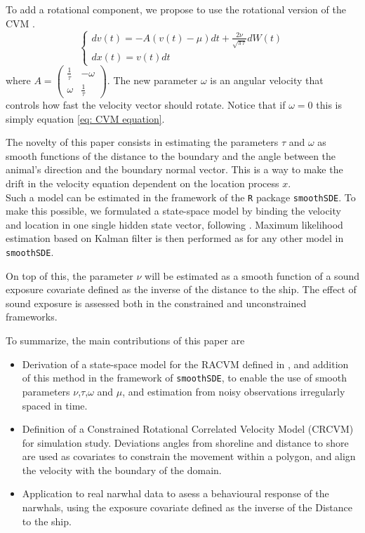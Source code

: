\documentclass[11pt]{article}
\newcommand {\1}{\mathbb{1}}
\begin{document}
To add a rotational component, we propose to use the rotational version of the CVM \cite{gurarie_correlated_2017,albertsen_generalizing_2019}.
\begin{equation} \left\{
	\begin{array}{l}
		dv(t)=-A(v(t)-\mu)dt+\frac{2\nu}{\sqrt{\pi \tau}} dW(t) \\
		dx(t)=v(t) dt
	\end{array}
	\right.
	\label{eq: RACVM equation}
\end{equation}
where $A=\begin{pmatrix} 
	\frac{1}{\tau} & -\omega \\
	\omega & \frac{1}{\tau}
\end{pmatrix}$.
The new parameter $\omega$ is an angular velocity that controls how fast the velocity vector should rotate. Notice that if $\omega=0$ this is simply equation \ref{eq: CVM equation}.

The novelty of this paper consists in estimating the parameters $\tau$ and $\omega$ as smooth functions of the distance to the boundary and the angle between the animal's direction and the boundary normal vector. This is a way to make the drift in the velocity equation dependent on the location process $x$. \\
Such a model can be estimated in the framework of the \texttt{R} package \texttt{smoothSDE}. To make this possible, we formulated a state-space model by binding the velocity and location in one single hidden state vector, following \cite{johnson_continuous_2008}. Maximum likelihood estimation based on Kalman filter is then performed as for any other model in \texttt{smoothSDE}.

On top of this, the parameter $\nu$ will be estimated as a smooth function of a sound exposure covariate defined as the inverse of the distance to the ship.
The effect of sound exposure is assessed both in the constrained and unconstrained frameworks.



To summarize, the main contributions of this paper are
\begin{itemize}
	\item Derivation of a state-space model for the RACVM defined in \cite{gurarie_correlated_2017}, and addition of this method in the framework of \texttt{smoothSDE}, to enable the use of smooth parameters $\nu$,$\tau$,$\omega$ and $\mu$, and estimation from noisy observations irregularly spaced in time.
	\item Definition of a Constrained Rotational Correlated Velocity Model (CRCVM) for simulation study. Deviations angles from shoreline and distance to shore are used as covariates to constrain the movement within a polygon, and align the velocity with the boundary of the domain.
	\item Application to real narwhal data to asess a behavioural response of the narwhals, using the exposure covariate defined as the inverse of the Distance to the ship.
\end{itemize}
\end{document}
